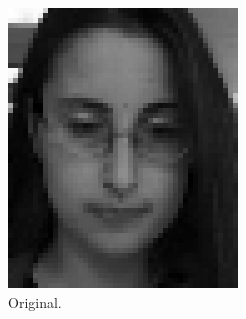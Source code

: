 \documentclass[a4paper, 10pt, conference]{ieeeconf}
\begin{document}
\begin{figure}[!ht]
	\captionsetup[subfigure]{position=b}
        \centering
        \begin{subfigure}{0.1\textwidth}
        \includegraphics[width=\textwidth]{src/face3.png}
                \caption{Original.}
        \end{subfigure}
        ~
        \begin{subfigure}{0.1\textwidth}

\end{subfigure}
\end{figure}
\end{document}
